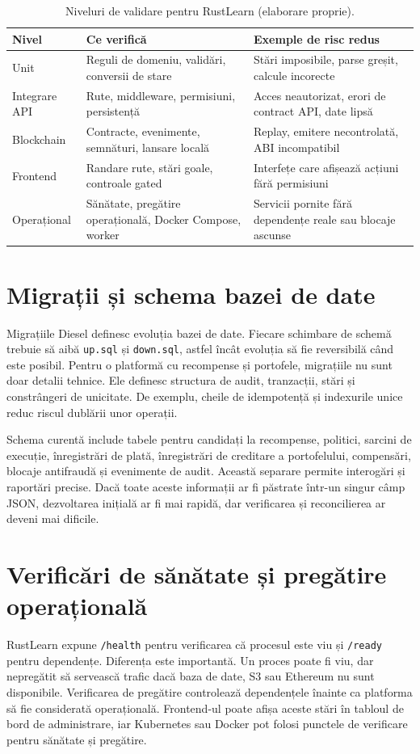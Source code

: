 \begin{table}[H]
    \centering
    \caption{Niveluri de validare pentru RustLearn (elaborare proprie).}
    \label{tab:testare}
    \begin{tabular}{P{3.4cm}P{5.2cm}P{5.1cm}}
        \toprule
        Nivel & Ce verifică & Exemple de risc redus \\
        \midrule
        Unit & Reguli de domeniu, validări, conversii de stare & Stări imposibile, parse greșit, calcule incorecte \\
        Integrare API & Rute, middleware, permisiuni, persistență & Acces neautorizat, erori de contract API, date lipsă \\
        Blockchain & Contracte, evenimente, semnături, lansare locală & Replay, emitere necontrolată, ABI incompatibil \\
        Frontend & Randare rute, stări goale, controale gated & Interfețe care afișează acțiuni fără permisiuni \\
        Operațional & Sănătate, pregătire operațională, Docker Compose, worker & Servicii pornite fără dependențe reale sau blocaje ascunse \\
        \bottomrule
    \end{tabular}
\end{table}

\section{Migrații și schema bazei de date}
Migrațiile Diesel definesc evoluția bazei de date. Fiecare schimbare de schemă trebuie să aibă \texttt{up.sql} și \texttt{down.sql}, astfel încât evoluția să fie reversibilă când este posibil. Pentru o platformă cu recompense și portofele, migrațiile nu sunt doar detalii tehnice. Ele definesc structura de audit, tranzacții, stări și constrângeri de unicitate. De exemplu, cheile de idempotență și indexurile unice reduc riscul dublării unor operații.

Schema curentă include tabele pentru candidați la recompense, politici, sarcini de execuție, înregistrări de plată, înregistrări de creditare a portofelului, compensări, blocaje antifraudă și evenimente de audit. Această separare permite interogări și raportări precise. Dacă toate aceste informații ar fi păstrate într-un singur câmp JSON, dezvoltarea inițială ar fi mai rapidă, dar verificarea și reconcilierea ar deveni mai dificile.

\section{Verificări de sănătate și pregătire operațională}
RustLearn expune \texttt{/health} pentru verificarea că procesul este viu și \texttt{/ready} pentru dependențe. Diferența este importantă. Un proces poate fi viu, dar nepregătit să servească trafic dacă baza de date, S3 sau Ethereum nu sunt disponibile. Verificarea de pregătire controlează dependențele înainte ca platforma să fie considerată operațională. Frontend-ul poate afișa aceste stări în tabloul de bord de administrare, iar Kubernetes sau Docker pot folosi punctele de verificare pentru sănătate și pregătire.

